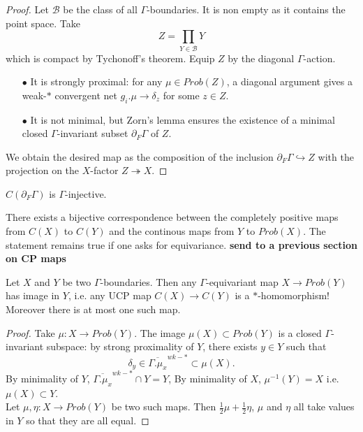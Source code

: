 \begin{proof}
Let $\mathcal B$ be the class of all $\Gamma$-boundaries. It is non empty as it contains the point space. Take
\[Z = \prod_{Y\in \mathcal B} Y \]
which is compact by Tychonoff's theorem. Equip $Z$ by the diagonal $\Gamma$-action. 
\begin{itemize}
\item[$\bullet$] It is strongly proximal: for any $\mu \in Prob(Z)$, a diagonal argument gives a weak-$*$ convergent net $g_i .\mu \rightarrow \delta_z$ for some $z\in Z$.   
\item[$\bullet$] It is not minimal, but Zorn's lemma ensures the existence of a minimal closed $\Gamma$-invariant subset $\partial_F \Gamma$ of $Z$.  
\end{itemize}
We obtain the desired map as the composition of the inclusion $\partial_F \Gamma \hookrightarrow Z$ with the projection on the $X$-factor $Z \twoheadrightarrow X$.
\end{proof}

\begin{thm} $C(\partial_F \Gamma)$ is $\Gamma$-injective.
\end{thm}

\begin{lem} There exists a bijective correspondence between the completely positive maps from $C(X)$ to $C(Y)$ and the continous maps from $Y$ to $Prob(X)$. The statement remains true if one asks for equivariance. \textbf{send to a previous section on CP maps}
\end{lem}

\begin{lem}[Furstenburg] Let $X$ and $Y$ be two $\Gamma$-boundaries. Then any $\Gamma$-equivariant map $X\rightarrow Prob(Y)$ has image in $Y$, i.e. any UCP map $C(X)\rightarrow C(Y)$ is a $*$-homomorphism! Moreover there is at most one such map.
\end{lem}

\begin{proof}
Take $\mu : X \rightarrow Prob(Y)$. The image $\mu(X)\subset Prob(Y)$ is a closed $\Gamma$-invariant subspace: by strong proximality of $Y$, there exists $y\in Y$ such that 
\[ \delta_y \in \overline{\Gamma . \mu_x}^{wk-*} \subset \mu(X).\]
By minimality of $Y$, $\overline{\Gamma . \mu_x}^{wk-*}\cap Y = Y$, By minimality of $X$, $\mu^{-1}(Y)= X$ i.e. $\mu(X)\subset Y $.\\

Let $\mu, \eta: X\rightarrow Prob(Y)$ be two such maps. Then $\frac{1}{2}\mu +\frac{1}{2}\eta$, $\mu$ and $\eta$ all take values in $Y$ so that they are all equal. 
\end{proof}  


